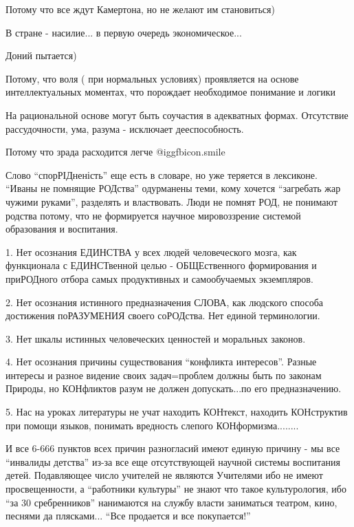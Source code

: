 \begin{itemize}
Потому что все ждут Камертона, но не желают им становиться)

В стране - насилие... в первую очередь экономическое...

Доний пытается)


Потому, что воля ( при нормальных условиях) проявляется на основе
интеллектуальных моментах, что порождает необходимое понимание и логики

На рациональной основе могут быть соучастия в адекватных формах. Отсутствие
рассудочности, ума, разума - исключает дееспособность.


Потому что зрада расходится легче  @igg{fbicon.smile} 


Слово \enquote{спорРІДненість} еще есть в словаре, но уже теряется в лексиконе. \enquote{Иваны
не помнящие РОДства} одурманены теми, кому хочется \enquote{загребать жар чужими
руками}, разделять и властвовать. Люди не помнят РОД, не понимают родства
потому, что не формируется научное мировоззрение системой образования и
воспитания. 

1. Нет осознания ЕДИНСТВА у всех людей человеческого мозга, как функционала с
ЕДИНСТвенной целью - ОБЩЕственного формирования и приРОДного отбора самых
продуктивных и самообучаемых экземпляров. 

2. Нет осознания истинного предназначения СЛОВА, как людского способа
достижения поРАЗУМЕНИЯ своего соРОДства. Нет единой терминологии. 

3. Нет шкалы истинных человеческих ценностей и моральных законов. 

4. Нет осознания причины существования \enquote{конфликта интересов}. Разные
интересы и разное видение своих задач=проблем должны быть по законам Природы,
но КОНфликтов разум не должен допускать...по его предназначению. 

5. Нас на уроках литературы не учат находить КОНтекст, находить КОНструктив при
помощи языков, понимать вредность слепого КОНформизма........

И все 6-666 пунктов всех причин разногласий имеют единую причину - мы все
\enquote{инвалиды детства} из-за все еще отсутствующей научной системы
воспитания детей. Подавляющее число учителей не являются Учителями ибо не имеют
просвещенности, а \enquote{работники культуры} не знают что такое
культурология, ибо \enquote{за 30 сребренников} нанимаются на службу власти
заниматься театром, кино, песнями да плясками... \enquote{Все продается и все
покупается!}


\end{itemize}
